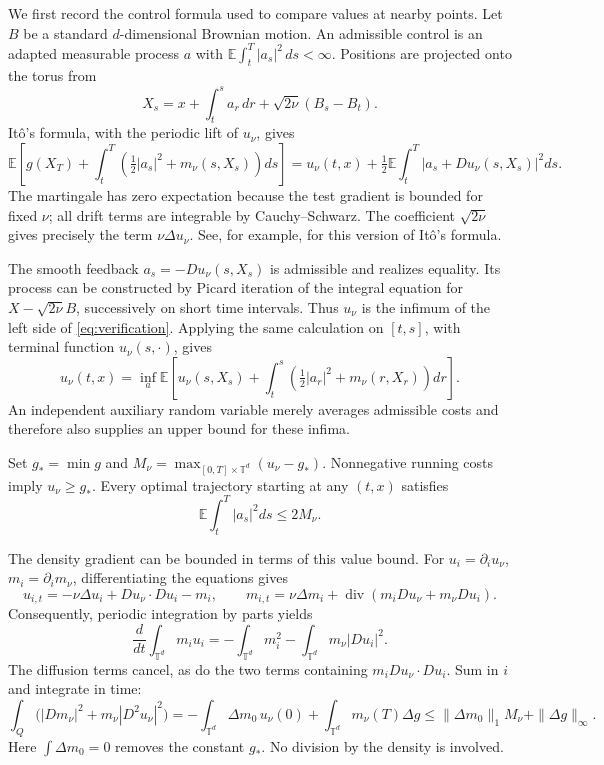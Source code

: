 \documentclass[11pt]{article}
\newcommand{\T}{\mathbb T}
\numberwithin{equation}{section}
\begin{document}
We first record the control formula used to compare values at nearby points.
Let \(B\) be a standard \(d\)-dimensional Brownian motion. An admissible
control is an adapted measurable process \(a\) with
\(\mathbb E\int_t^T|a_s|^2\,ds<\infty\). Positions are projected onto the
torus from
\[
 X_s=x+\int_t^s a_r\,dr+\sqrt{2\nu}(B_s-B_t).
\]
It\^o's formula, with the periodic lift of \(u_\nu\), gives
\begin{equation}\label{eq:verification}
 \mathbb E\left[g(X_T)+\int_t^T
       \left(\tfrac12|a_s|^2+m_\nu(s,X_s)\right)ds\right]
 =u_\nu(t,x)+\tfrac12\mathbb E\int_t^T
       |a_s+Du_\nu(s,X_s)|^2ds .
\end{equation}
The martingale has zero expectation because the test gradient is bounded
for fixed \(\nu\); all drift terms are integrable by Cauchy--Schwarz.
The coefficient \(\sqrt{2\nu}\) gives precisely the term \(\nu\Delta u_\nu\).
See, for example, \cite[Theorem~3.7.1]{Lawler} for this version of
It\^o's formula.

The smooth feedback \(a_s=-Du_\nu(s,X_s)\) is admissible and realizes
equality. Its process can be constructed by Picard iteration of the
integral equation for \(X-\sqrt{2\nu}B\), successively on short time
intervals. Thus \(u_\nu\) is the infimum of the left side of
\eqref{eq:verification}. Applying the same calculation on \([t,s]\),
with terminal function \(u_\nu(s,\cdot)\), gives
\begin{equation}\label{eq:interval}
 u_\nu(t,x)=\inf_a\mathbb E\left[
 u_\nu(s,X_s)+\int_t^s
 \left(\tfrac12|a_r|^2+m_\nu(r,X_r)\right)dr\right].
\end{equation}
An independent auxiliary random variable merely averages admissible costs
and therefore also supplies an upper bound for these infima.

Set \(g_*=\min g\) and
\(M_\nu=\max_{[0,T]\times\T^d}(u_\nu-g_*)\).
Nonnegative running costs imply \(u_\nu\ge g_*\). Every optimal trajectory
starting at any \((t,x)\) satisfies
\begin{equation}\label{eq:optimal-energy}
 \mathbb E\int_t^T|a_s|^2ds\le2M_\nu .
\end{equation}

The density gradient can be bounded in terms of this value bound.
For \(u_i=\partial_i u_\nu\), \(m_i=\partial_i m_\nu\), differentiating
the equations gives
\[
 u_{i,t}=-\nu\Delta u_i+Du_\nu\cdot Du_i-m_i,\qquad
 m_{i,t}=\nu\Delta m_i+
 \operatorname{div}(m_iDu_\nu+m_\nu Du_i).
\]
Consequently, periodic integration by parts yields
\[
 \frac d{dt}\int_{\T^d}m_i u_i
   =-\int_{\T^d}m_i^2-\int_{\T^d}m_\nu|Du_i|^2 .
\]
The diffusion terms cancel, as do the two terms containing
\(m_iDu_\nu\cdot Du_i\). Sum in \(i\) and integrate in time:
\begin{equation}\label{eq:derivative-energy}
 \int_Q\bigl(|Dm_\nu|^2+m_\nu|D^2u_\nu|^2\bigr)
 =-\int_{\T^d}\Delta m_0\,u_\nu(0)
       +\int_{\T^d}m_\nu(T)\Delta g
 \le \|\Delta m_0\|_1 M_\nu+\|\Delta g\|_\infty .
\end{equation}
Here \(\int\Delta m_0=0\) removes the constant \(g_*\). No division by
the density is involved.
\end{document}

